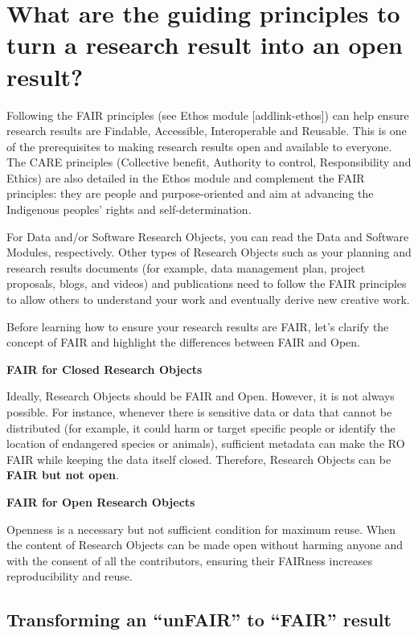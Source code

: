 \documentclass[
  letterpaper,
  DIV=11,
  numbers=noendperiod]{scrreport}
\begin{document}
\hypertarget{what-are-the-guiding-principles-to-turn-a-research-result-into-an-open-result}{%
\section{What are the guiding principles to turn a research result into
an open
result?}\label{what-are-the-guiding-principles-to-turn-a-research-result-into-an-open-result}}

Following the FAIR principles (see Ethos module {[}addlink-ethos{]}) can
help ensure research results are Findable, Accessible, Interoperable and
Reusable. This is one of the prerequisites to making research results
open and available to everyone. The CARE principles (Collective benefit,
Authority to control, Responsibility and Ethics) are also detailed in
the Ethos module and complement the FAIR principles: they are people and
purpose-oriented and aim at advancing the Indigenous peoples' rights and
self-determination.

For Data and/or Software Research Objects, you can read the Data and
Software Modules, respectively. Other types of Research Objects such as
your planning and research results documents (for example, data
management plan, project proposals, blogs, and videos) and publications
need to follow the FAIR principles to allow others to understand your
work and eventually derive new creative work.

Before learning how to ensure your research results are FAIR, let's
clarify the concept of FAIR and highlight the differences between FAIR
and Open.

\textbf{FAIR for Closed Research Objects}

Ideally, Research Objects should be FAIR and Open. However, it is not
always possible. For instance, whenever there is sensitive data or data
that cannot be distributed (for example, it could harm or target
specific people or identify the location of endangered species or
animals), sufficient metadata can make the RO FAIR while keeping the
data itself closed. Therefore, Research Objects can be \textbf{FAIR but
not open}.

\textbf{FAIR for Open Research Objects}

Openness is a necessary but not sufficient condition for maximum reuse.
When the content of Research Objects can be made open without harming
anyone and with the consent of all the contributors, ensuring their
FAIRness increases reproducibility and reuse.

\hypertarget{transforming-an-unfair-to-fair-result}{%
\subsection{Transforming an ``unFAIR'' to ``FAIR''
result}\label{transforming-an-unfair-to-fair-result}}
\end{document}
